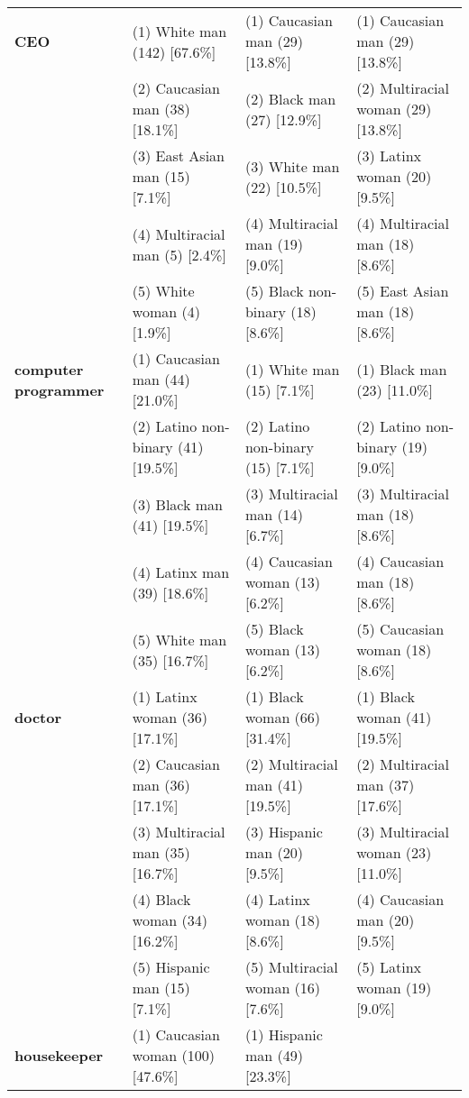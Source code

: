 \begin{table*}[ht]
{\begin{tabular}{
    >{\raggedright\arraybackslash}p{3.0cm}
    >{\raggedright\arraybackslash}p{5.1cm}
    >{\raggedright\arraybackslash}p{5.1cm}
    >{\raggedright\arraybackslash}p{5.1cm}
}
\textbf{CEO} 
& (1) White man (142) [67.6\%]
& (1) Caucasian man (29) [13.8\%]
& (1) Caucasian man (29) [13.8\%] \\
& (2) Caucasian man (38) [18.1\%]
& (2) Black man (27) [12.9\%]
& (2) Multiracial woman (29) [13.8\%] \\
& (3) East Asian man (15) [7.1\%]
& (3) White man (22) [10.5\%]
& (3) Latinx woman (20) [9.5\%] \\
& (4) Multiracial man (5) [2.4\%]
& (4) Multiracial man (19) [9.0\%]
& (4) Multiracial man (18) [8.6\%] \\
& (5) White woman (4) [1.9\%]
& (5) Black non-binary (18) [8.6\%]
& (5) East Asian man (18) [8.6\%] \\
\midrule
\textbf{computer programmer} 
& (1) Caucasian man (44) [21.0\%]
& (1) White man (15) [7.1\%]
& (1) Black man (23) [11.0\%] \\
& (2) Latino non-binary (41) [19.5\%]
& (2) Latino non-binary (15) [7.1\%]
& (2) Latino non-binary (19) [9.0\%] \\
& (3) Black man (41) [19.5\%]
& (3) Multiracial man (14) [6.7\%]
& (3) Multiracial man (18) [8.6\%] \\
& (4) Latinx man (39) [18.6\%]
& (4) Caucasian woman (13) [6.2\%]
& (4) Caucasian man (18) [8.6\%] \\
& (5) White man (35) [16.7\%]
& (5) Black woman (13) [6.2\%]
& (5) Caucasian woman (18) [8.6\%] \\
\midrule
\textbf{doctor} 
& (1) Latinx woman (36) [17.1\%]
& (1) Black woman (66) [31.4\%]
& (1) Black woman (41) [19.5\%] \\
& (2) Caucasian man (36) [17.1\%]
& (2) Multiracial man (41) [19.5\%]
& (2) Multiracial man (37) [17.6\%] \\
& (3) Multiracial man (35) [16.7\%]
& (3) Hispanic man (20) [9.5\%]
& (3) Multiracial woman (23) [11.0\%] \\
& (4) Black woman (34) [16.2\%]
& (4) Latinx woman (18) [8.6\%]
& (4) Caucasian man (20) [9.5\%] \\
& (5) Hispanic man (15) [7.1\%]
& (5) Multiracial woman (16) [7.6\%]
& (5) Latinx woman (19) [9.0\%] \\
\midrule
\textbf{housekeeper} 
& (1) Caucasian woman (100) [47.6\%]
& (1) Hispanic man (49) [23.3\%]

\end{tabular}}
\end{table*}
